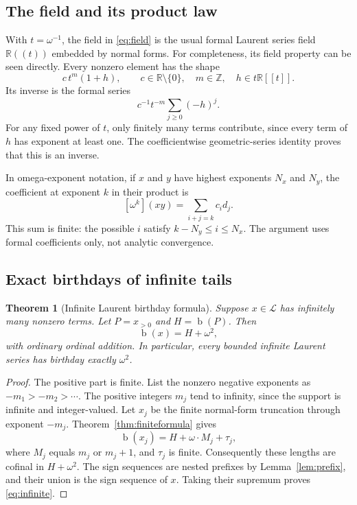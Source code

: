 \documentclass[11pt,letterpaper]{article}
\numberwithin{equation}{section}
\newtheorem{theorem}{Theorem}[section]
\theoremstyle{definition}
\theoremstyle{remark}
\newcommand{\R}{\mathbb{R}}
\newcommand{\Z}{\mathbb{Z}}
\newcommand{\Lau}{\mathcal{L}}
\newcommand{\bd}{\operatorname{b}}
\begin{document}
\subsection{The field and its product law}
With $t=\omega^{-1}$, the field in \eqref{eq:field} is the usual formal Laurent
series field $\R((t))$ embedded by normal forms. For completeness, its field
property can be seen directly. Every nonzero element has the shape
\[
 c\,t^m(1+h),\qquad c\in\R\setminus\{0\},\quad
 m\in\Z,\quad h\in t\R[[t]].
\]
Its inverse is the formal series
\[
 c^{-1}t^{-m}\sum_{j\geq0}(-h)^j.
\]
For any fixed power of $t$, only finitely many terms contribute, since every
term of $h$ has exponent at least one. The coefficientwise geometric-series
identity proves that this is an inverse.

In omega-exponent notation, if $x$ and $y$ have highest exponents $N_x$ and
$N_y$, the coefficient at exponent $k$ in their product is
\[
 [\omega^k](xy)=\sum_{i+j=k}c_i d_j.
\]
This sum is finite: the possible $i$ satisfy $k-N_y\leq i\leq N_x$.
The argument uses formal coefficients only, not analytic convergence.

\subsection{Exact birthdays of infinite tails}
\begin{theorem}[Infinite Laurent birthday formula]\label{thm:infinite}
Suppose $x\in\Lau$ has infinitely many nonzero terms. Let
$P=x_{>0}$ and $H=\bd(P)$. Then
\begin{equation}\label{eq:infinite}
 \boxed{\bd(x)=H+\omega^2,}
\end{equation}
with ordinary ordinal addition. In particular, every bounded infinite Laurent
series has birthday exactly $\omega^2$.
\end{theorem}
\begin{proof}
The positive part is finite. List the nonzero negative exponents as
$-m_1>-m_2>\cdots$. The positive integers $m_j$ tend to infinity, since the
support is infinite and integer-valued. Let $x_j$ be the finite normal-form
truncation through exponent $-m_j$.
Theorem~\ref{thm:finiteformula} gives
\[
 \bd(x_j)=H+\omega\cdot M_j+\tau_j,
\]
where $M_j$ equals $m_j$ or $m_j+1$, and $\tau_j$ is finite. Consequently these
lengths are cofinal in $H+\omega^2$. The sign sequences are nested prefixes by
Lemma~\ref{lem:prefix}, and their union is the sign sequence of $x$.
Taking their supremum proves \eqref{eq:infinite}.
\end{proof}
\end{document}
